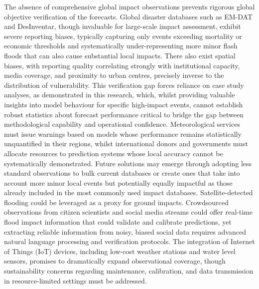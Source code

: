 The  absence of comprehensive global impact observations prevents rigorous global objective verification of the forecasts. Global disaster databases such as EM-DAT and DesInventar, though invaluable for large-scale impact assessment, exhibit severe reporting biases, typically capturing only events exceeding mortality or economic thresholds and systematically under-representing more minor flash floods that can also cause substantial local impacts. There also exist spatial biases, with reporting quality correlating strongly with institutional capacity, media coverage, and proximity to urban centres, precisely inverse to the distribution of vulnerability. This verification gap forces reliance on case study analyses, as demonstrated in this research, which, whilst providing valuable insights into model behaviour for specific high-impact events, cannot establish robust statistics about forecast performance critical to bridge the gap between methodological capability and operational confidence. Meteorological services must issue warnings based on models whose performance remains statistically unquantified in their regions, whilst international donors and governments must allocate resources to prediction systems whose local accuracy cannot be systematically demonstrated. Future solutions may emerge through adopting less standard observations to bulk current databases or create ones that take into account more minor local events but potentially equally impactful as those already included in the most commonly used impact databases. Satellite-detected flooding could be leveraged as a proxy for ground impacts. Crowdsourced observations from citizen scientists and social media streams could offer real-time flood impact information that could validate and calibrate predictions, yet extracting reliable information from noisy, biased social data requires advanced natural language processing and verification protocols. The integration of Internet of Things (IoT) devices, including low-cost weather stations and water level sensors, promises to dramatically expand observational coverage, though sustainability concerns regarding maintenance, calibration, and data transmission in resource-limited settings must be addressed. 


